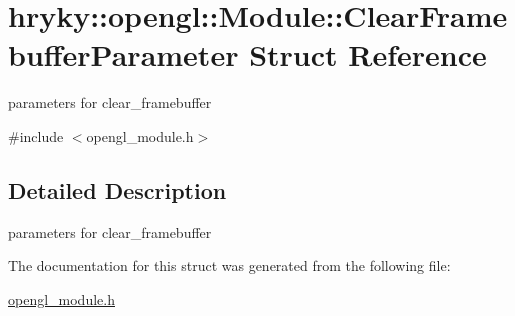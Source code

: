 \hypertarget{structhryky_1_1opengl_1_1_module_1_1_clear_framebuffer_parameter}{\section{hryky\-:\-:opengl\-:\-:Module\-:\-:Clear\-Framebuffer\-Parameter Struct Reference}
\label{structhryky_1_1opengl_1_1_module_1_1_clear_framebuffer_parameter}
}


parameters for clear\-\_\-framebuffer  




{\ttfamily \#include $<$opengl\-\_\-module.\-h$>$}



\subsection{Detailed Description}
parameters for clear\-\_\-framebuffer 

The documentation for this struct was generated from the following file\-:\begin{DoxyCompactItemize}
\item 
\hyperlink{opengl__module_8h}{opengl\-\_\-module.\-h}\end{DoxyCompactItemize}
